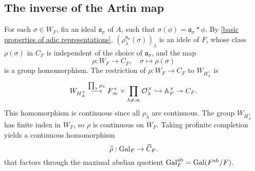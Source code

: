 \documentclass{article}
\renewcommand{\O}{\mathcal{O}}
\newcommand{\ab}{\mathrm{ab}}
\begin{document}
\subsection{The inverse of the Artin map}
For each $\sigma\in W_F$,
fix an ideal $\mathfrak{a}_\sigma$ of $A$,
such that $\sigma(\phi) = \mathfrak{a}_\sigma * \phi$.
By \cref{basic properties of adic representations}, $\left( \rho_\lambda^{\mathfrak{a}_\sigma}(\sigma) \right)_\lambda$ is an idele of $F$, whose class $\rho(\sigma)$ in $C_F$ is independent of the choice of $\mathfrak{a}_\sigma$,
and the map \[\rho : W_F\to C_F,\quad \sigma\mapsto\rho(\sigma)\]
is a group homomorphism.
The restriction of $\rho : W_F\to C_F$ to $W_{H_A^+}$ is
\[W_{H_A^+}\stackrel{\prod_{\lambda}\rho_\lambda}{\longrightarrow} F_\infty^+\times \prod_{\lambda\ne\infty} \O_\lambda^\times\hookrightarrow\A_F^\times\surject C_F.\]
This homomorphism is continuous since all $\rho_\lambda$ are continuous.
The group $W_{H_A^+}$ has finite index in $W_F$,
so $\rho$ is continuous on $W_F$.
Taking profinite completion yields a continuous homomorphism
\[\widehat\rho : \operatorname{Gal}_F\to \widehat C_F.\]
that factors through the maximal abelian quotient $\gal_F^\ab = \gal(F^\ab/F)$.
\end{document}
